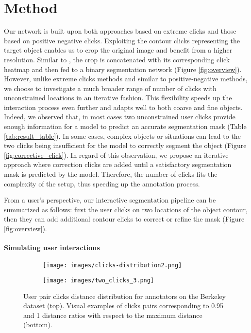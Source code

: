 \documentclass[letterpaper, 10 pt, conference]{ieeeconf}
\begin{document}
\section{Method}

Our network is built upon both approaches based on extreme clicks and those based on positive negative clicks. Exploiting the contour clicks representing the target object enables us to crop the original image and benefit from a higher resolution. Similar to \cite{maninis18}, the crop is concatenated with its corresponding click heatmap and then fed to a binary segmentation network (Figure \ref{fig:overview}). However, unlike extreme clicks methods and similar to positive-negative methods, we choose to investigate a much broader range of number of clicks with unconstrained locations in an iterative fashion. This flexibility speeds up the interaction process even further and adapts well to both coarse and fine objects. Indeed, we observed that, in most cases two unconstrained user clicks provide enough information for a model to predict an accurate segmentation mask (Table \ref{tab:result_table}). In some cases, complex objects or situations can lead to the two clicks being insufficient for the model to correctly segment the object (Figure \ref{fig:corrective_click}). In regard of this observation, we propose an iterative approach where correction clicks are added until a satisfactory segmentation mask is predicted by the model. Therefore, the number of clicks fits the complexity of the setup, thus speeding up the annotation process.




From a user's perspective, our interactive segmentation pipeline can be summarized as follows: first the user clicks on two locations of the object contour, then they can add additional contour clicks to correct or refine the mask (Figure \ref{fig:overview}).

\paragraph{Simulating user interactions}

\begin{figure}
    \centering
    \begin{subfigure}{.52\linewidth}
        \centering
        \texttt{[image: images/clicks-distribution2.png]}
    \end{subfigure}
    \begin{subfigure}{\linewidth}
        \centering
        \texttt{[image: images/two\_clicks\_3.png]}
    \end{subfigure}
     \caption{User pair clicks distance distribution for  annotators on the Berkeley dataset \cite{martin01} (top). Visual examples of clicks pairs corresponding to 0.95 and 1 distance ratios with respect to the maximum distance (bottom).
     }
    \label{fig:clicks-distribution}
\end{figure}
\end{document}
